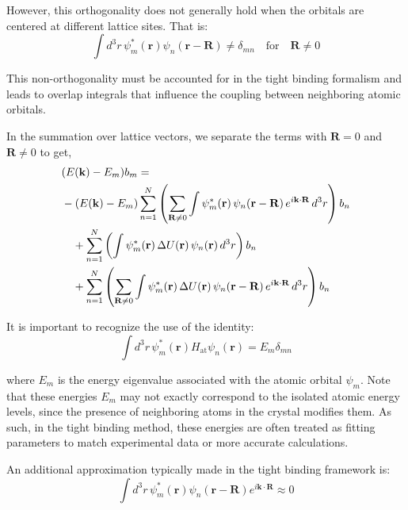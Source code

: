 \noindent
However, this orthogonality does not generally hold when the orbitals are centered at different lattice sites. That is:
\begin{equation}
	\int d^3r \, \psi_m^*(\mathbf{r}) \psi_n(\mathbf{r} - \mathbf{R}) \neq \delta_{mn} \quad \text{for} \quad \mathbf{R} \ne 0
\end{equation}

\noindent
This non-orthogonality must be accounted for in the tight binding formalism and leads to overlap integrals that influence the coupling between neighboring atomic orbitals.

In the summation over lattice vectors, we separate the terms with $\mathbf{R} = 0$ and $\mathbf{R} \neq 0$ to get,
\begin{align*}
	 & (E(\mathbf{k}) - E_m) b_m =                                                                                                                                                                           \\
	 & -(E(\mathbf{k}) - E_m) \sum_{n=1}^{N} \left( \sum_{\mathbf{R} \neq 0} \int \psi_m^*(\mathbf{r}) \, \psi_n(\mathbf{r} - \mathbf{R}) \, e^{i \mathbf{k} \cdot \mathbf{R}} \, d^3 r \right) b_n \notag   \\
	 & \quad + \sum_{n=1}^{N} \left( \int \psi_m^*(\mathbf{r}) \, \Delta U(\mathbf{r}) \, \psi_n(\mathbf{r}) \, d^3 r \right) b_n \notag                                                                     \\
	 & \quad + \sum_{n=1}^{N} \left( \sum_{\mathbf{R} \neq 0} \int \psi_m^*(\mathbf{r}) \, \Delta U(\mathbf{r}) \, \psi_n(\mathbf{r} - \mathbf{R}) \, e^{i \mathbf{k} \cdot \mathbf{R}} \, d^3 r \right) b_n
\end{align*}

It is important to recognize the use of the identity:
\begin{equation}
	\int d^3r \, \psi_m^*(\mathbf{r}) H_{\text{at}} \psi_n(\mathbf{r}) = E_m \delta_{mn}
\end{equation}

\noindent
where \( E_m \) is the energy eigenvalue associated with the atomic orbital \( \psi_m \). Note that these energies \( E_m \) may not exactly correspond to the isolated atomic energy levels, since the presence of neighboring atoms in the crystal modifies them. As such, in the tight binding method, these energies are often treated as fitting parameters to match experimental data or more accurate calculations.

An additional approximation typically made in the tight binding framework is:
\begin{equation}
	\int d^3r \, \psi_m^*(\mathbf{r}) \psi_n(\mathbf{r} - \mathbf{R}) e^{i\mathbf{k} \cdot \mathbf{R}} \approx 0
\end{equation}

